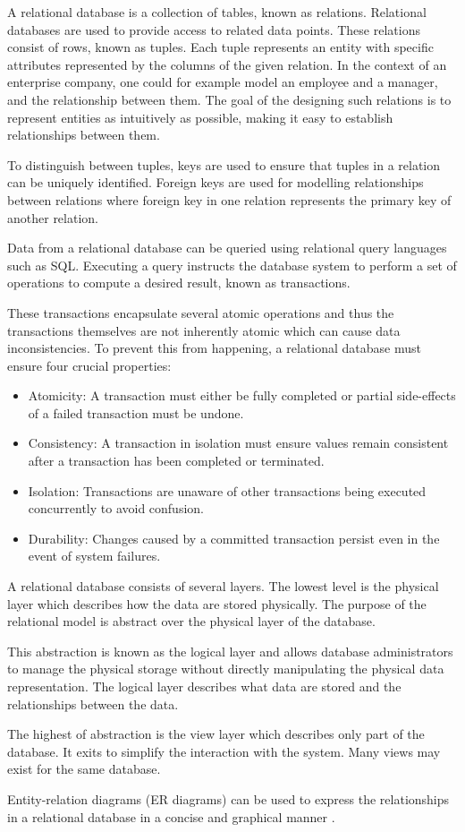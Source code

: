 A relational database is a collection of tables, known as relations. Relational databases are used to provide access to related data points.
These relations consist of rows, known as tuples. Each tuple represents an entity with specific attributes represented by the columns of the given relation.
In the context of an enterprise company, one could for example model an employee and a manager, and the relationship between them.
The goal of the designing such relations is to represent entities as intuitively as possible, making it easy to establish relationships between them. 

To distinguish between tuples, keys are used to ensure that tuples in a relation can be uniquely identified.
Foreign keys are used for modelling relationships between relations where foreign key in one relation represents the primary key of another relation.

Data from a relational database can be queried using relational query languages such as SQL.
Executing a query instructs the database system to perform a set of operations to compute a desired result, known as transactions.

These transactions encapsulate several atomic operations and thus the transactions themselves are not inherently atomic which can cause data inconsistencies. 
To prevent this from happening, a relational database must ensure four crucial properties:
\begin{itemize}
    \item Atomicity: A transaction must either be fully completed or partial side-effects of a failed transaction must be undone.
    \item Consistency: A transaction in isolation must ensure values remain consistent after a transaction has been completed or terminated.
    \item Isolation: Transactions are unaware of other transactions being executed concurrently to avoid confusion.
    \item Durability: Changes caused by a committed transaction persist even in the event of system failures.
\end{itemize}

A relational database consists of several layers.
The lowest level is the physical layer which describes how the data are stored physically.
The purpose of the relational model is abstract over the physical layer of the database.

This abstraction is known as the logical layer and allows database administrators to manage the physical storage without directly manipulating the physical data representation.
The logical layer describes what data are stored and the relationships between the data.

The highest of abstraction is the view layer which describes only part of the database. It exits to simplify the interaction with the system. Many views may exist for the same database.

Entity-relation diagrams (ER diagrams) can be used to express the relationships in a relational database in a concise and graphical manner \cite{DBSBook} \cite{OracleRDBMS}.